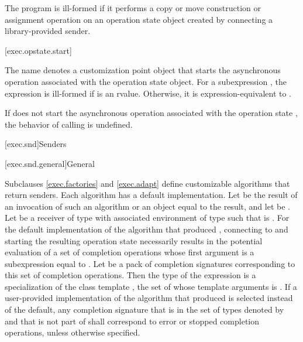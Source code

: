 \pnum
The program is ill-formed
if it performs a copy or move construction or assignment operation on
an operation state object created by connecting a library-provided sender.

[exec.opstate.start]{}

\pnum
The name  denotes a customization point object
that starts
the asynchronous operation associated with the operation state object.
For a subexpression ,
the expression  is ill-formed
if  is an rvalue.
Otherwise, it is expression-equivalent to
.

\pnum
If  does not start
the asynchronous operation associated with the operation state ,
the behavior of calling  is undefined.

[exec.snd]{Senders}

[exec.snd.general]{General}

\pnum
Subclauses \ref{exec.factories} and \ref{exec.adapt} define
customizable algorithms that return senders.
Each algorithm has a default implementation.
Let  be the result of an invocation of such an algorithm or
an object equal to the result, and
let  be .
Let  be a receiver of type 
with associated environment  of type 
such that  is .
For the default implementation of the algorithm that produced ,
connecting  to  and
starting the resulting operation state
necessarily results in the potential evaluation of
a set of completion operations
whose first argument is a subexpression equal to .
Let  be a pack of completion signatures corresponding to
this set of completion operations.
Then the type of the expression  is
a specialization of
the class template ,
the set of whose template arguments is .
If a user-provided implementation of the algorithm
that produced  is selected instead of the default,
any completion signature
that is in the set of types
denoted by  and
that is not part of  shall correspond to
error or stopped completion operations,
unless otherwise specified.

